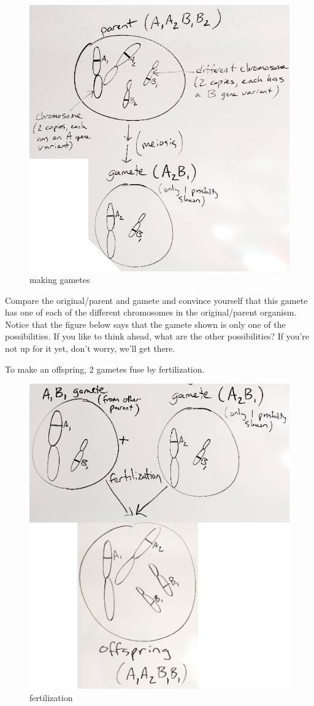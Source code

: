 \documentclass[]{book}
\theoremstyle{definition}
\theoremstyle{definition}
\theoremstyle{definition}
\theoremstyle{remark}
\begin{document}
\begin{figure}

{\centering \includegraphics[width=0.75\linewidth]{01-basics-figures/meiosis2} 

}

\caption{making gametes}\label{fig:gen-fig-152}
\end{figure}

Compare the original/parent and gamete and convince yourself that this
gamete has one of each of the different chromosomes in the
original/parent organism. Notice that the figure below says that the
gamete shown is only one of the possibilities. If you like to think
ahead, what are the other possibilities? If you're not up for it yet,
don't worry, we'll get there.

To make an offspring, 2 gametes fuse by fertilization.

\begin{figure}

{\centering \includegraphics[width=0.75\linewidth]{01-basics-figures/meiosis3} 

}

\caption{fertilization}\label{fig:gen-fig-153}
\end{figure}
\end{document}
